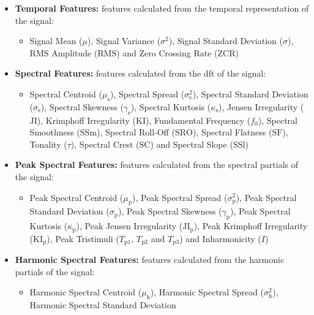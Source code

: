 		\begin{itemize}
			\item {\bf{Temporal Features:}} features calculated from the temporal representation of the signal:
			\begin{itemize}
				\item Signal Mean ($\mu$), Signal Variance ($\sigma^{2}$), Signal Standard Deviation
				      ($\sigma$), RMS Amplitude ($\mathrm{RMS}$) and Zero Crossing Rate ($\mathrm{ZCR}$)
			\end{itemize}
		\item {\bf{Spectral Features:}} features calculated from the \acrshort{dft} of the signal:
			\begin{itemize}
				\item Spectral Centroid ($\mu_{\mathrm{s}}$), Spectral Spread ($\sigma_{\mathrm{s}}^{2}$),
				      Spectral Standard Deviation ($\sigma_{\mathrm{s}}$), Spectral Skewness
				      ($\gamma_{\mathrm{s}}$), Spectral Kurtosis ($\kappa_{\mathrm{s}}$), Jensen
				      Irregularity ($\mathrm{JI}$), Krimphoff Irregularity ($\mathrm{KI}$), Fundamental
				      Frequency ($f_{0}$), Spectral Smoothness ($\mathrm{SSm}$), Spectral Roll-Off
				      ($\mathrm{SRO}$), Spectral Flatness ($\mathrm{SF}$), Tonality ($\tau$), Spectral
				      Crest ($\mathrm{SC}$) and Spectral Slope ($\mathrm{SSl}$)
			\end{itemize}
			\item {\bf{Peak Spectral Features:}} features calculated from the spectral partials of the signal:
			\begin{itemize}
				\item Peak Spectral Centroid ($\mu_{\mathrm{p}}$), Peak Spectral Spread
				      ($\sigma_{\mathrm{p}}^{2}$), Peak Spectral Standard Deviation
				      ($\sigma_{\mathrm{p}}$), Peak Spectral Skewness ($\gamma_{\mathrm{p}}$), Peak
				      Spectral Kurtosis ($\kappa_{\mathrm{p}}$), Peak Jensen Irregularity
				      ($\mathrm{JI_{p}}$), Peak Krimphoff Irregularity
				      ($\mathrm{KI_{p}}$), Peak Tristimuli ($T_{\mathrm{p}1}$, $T_{\mathrm{p}2}$
				      and $T_{\mathrm{p}3}$) and Inharmonicity ($I$)
			\end{itemize}
			\item {\bf{Harmonic Spectral Features:}} features calculated from the harmonic partials of the
			      signal:
			\begin{itemize}
				\item Harmonic Spectral Centroid ($\mu_{\mathrm{h}}$), Harmonic Spectral Spread
				      ($\sigma_{\mathrm{h}}^{2}$), Harmonic Spectral Standard Deviation

\end{itemize}
\end{itemize}
